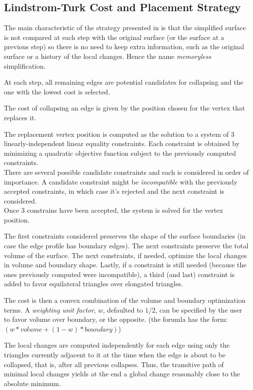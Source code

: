 \begin{ccAdvanced}
\subsection{Lindstrom-Turk Cost and Placement Strategy\label{SurfaceMeshSimplification:LindstromTurkStrategy}}

The main characteristic of the strategy presented in
\cite{cgal:lt-fmeps-98,cgal:lt-ems-99} is that the simplified surface
is not compared at each step with the original surface (or the surface
at a previous step) so there is no need to keep extra information,
such as the original surface or a history of the local changes. Hence
the name {\em memoryless} simplification.

At each step, all remaining edges are potential candidates for 
collapsing and the one with the lowest cost is selected.

The cost of collapsing an edge is given by the position chosen for the
vertex that replaces it. 

The replacement vertex position is computed as
the solution to a system of 3 linearly-independent linear equality constraints.
Each constraint is obtained by minimizing a quadratic objective function
subject to the previously computed constraints.\\
There are several possible candidate constraints and each is considered in order of importance.
A candidate constraint might be {\em incompatible} with the previously accepted constraints,
in which case it's rejected and the next constraint is considered.\\
Once 3 constrains have been accepted, the system is solved for the vertex position.

The first constraints considered preserves the shape of the surface boundaries 
(in case the edge profile has boundary edges).
The next constraints preserve the total volume of the surface.
The next constraints, if needed, optimize the local changes in volume and boundary shape.
Lastly, if a constraint is still needed (because the ones previously computed were incompatible),
a third (and last) constraint is added to favor equilateral triangles over elongated triangles.

The cost is then a convex combination of the volume and boundary optimization terms.
A {\em weighting unit factor}, $w$, defaulted to $1/2$, can be specified by the user to favor volume over
boundary, or the opposite. (the forumla has the form: $(w*volume+(1-w)*boundary)$)

The local changes are computed independently for each edge using only
the triangles currently adjacent to it at the time when the edge 
is about to be collapsed, that is, after all previous collapses.
Thus, the transitive path of minimal local changes yields at
the end a global change reasonably close to the absolute minimum.
\end{ccAdvanced}

